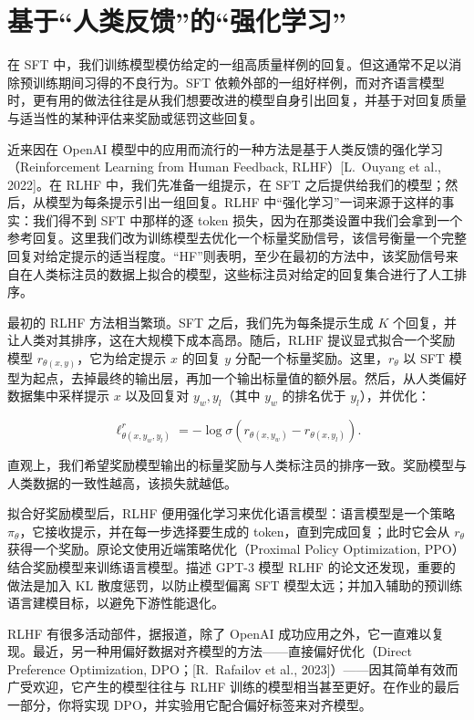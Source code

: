 \section{基于“人类反馈”的“强化学习”}

在 SFT 中，我们训练模型模仿给定的一组高质量样例的回复。但这通常不足以消除预训练期间习得的不良行为。SFT 依赖外部的一组好样例，而对齐语言模型时，更有用的做法往往是从我们想要改进的模型自身引出回复，并基于对回复质量与适当性的某种评估来奖励或惩罚这些回复。

近来因在 OpenAI 模型中的应用而流行的一种方法是基于人类反馈的强化学习（Reinforcement Learning from Human Feedback, RLHF）[L.~Ouyang et al., 2022]。在 RLHF 中，我们先准备一组提示，在 SFT 之后提供给我们的模型；然后，从模型为每条提示引出一组回复。RLHF 中“强化学习”一词来源于这样的事实：我们得不到 SFT 中那样的逐 token 损失，因为在那类设置中我们会拿到一个参考回复。这里我们改为训练模型去优化一个标量奖励信号，该信号衡量一个完整回复对给定提示的适当程度。“HF”则表明，至少在最初的方法中，该奖励信号来自在人类标注员的数据上拟合的模型，这些标注员对给定的回复集合进行了人工排序。

最初的 RLHF 方法相当繁琐。SFT 之后，我们先为每条提示生成 $K$ 个回复，并让人类对其排序，这在大规模下成本高昂。随后，RLHF 提议显式拟合一个奖励模型 $r_{\theta(x,y)}$，它为给定提示 $x$ 的回复 $y$ 分配一个标量奖励。这里，$r_\theta$ 以 SFT 模型为起点，去掉最终的输出层，再加一个输出标量值的额外层。然后，从人类偏好数据集中采样提示 $x$ 以及回复对 $y_w, y_l$（其中 $y_w$ 的排名优于 $y_l$），并优化：

\begin{equation}
\ell^{r}_{\theta(x, y_w, y_l)} = -\log \sigma\!\left( r_{\theta(x, y_w)} - r_{\theta(x, y_l)} \right).
\end{equation}

直观上，我们希望奖励模型输出的标量奖励与人类标注员的排序一致。奖励模型与人类数据的一致性越高，该损失就越低。

拟合好奖励模型后，RLHF 便用强化学习来优化语言模型：语言模型是一个策略 $\pi_\theta$，它接收提示，并在每一步选择要生成的 token，直到完成回复；此时它会从 $r_\theta$ 获得一个奖励。原论文使用近端策略优化（Proximal Policy Optimization, PPO）结合奖励模型来训练语言模型。描述 GPT-3 模型 RLHF 的论文还发现，重要的做法是加入 KL 散度惩罚，以防止模型偏离 SFT 模型太远；并加入辅助的预训练语言建模目标，以避免下游性能退化。

RLHF 有很多活动部件，据报道，除了 OpenAI 成功应用之外，它一直难以复现。最近，另一种用偏好数据对齐模型的方法——直接偏好优化（Direct Preference Optimization, DPO；[R.~Rafailov et al., 2023]）——因其简单有效而广受欢迎，它产生的模型往往与 RLHF 训练的模型相当甚至更好。在作业的最后一部分，你将实现 DPO，并实验用它配合偏好标签来对齐模型。

